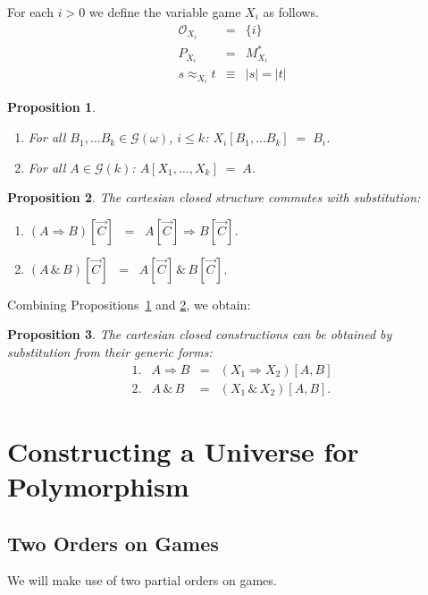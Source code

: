 \documentclass[a4paper,11pt]{article}
\newcommand{\gequiv}{\approx}
\newtheorem{proposition}{Proposition}[section]
\newcommand{\GG}[1]{\mathcal{G}(#1)}
\newcommand{\llwith}{\, \& \,}
\newcommand{\Occ}{\mathcal{O}}
\begin{document}
\noindent For each $i > 0$ we define the variable game $X_i$ as follows.
\[ \begin{array}{lcl}
\Occ_{X_i} & = & \{ i \} \\
P_{X_i} & = & M_{X_i}^{\ast} \\
s \gequiv_{X_i} t & \equiv & | s | = | t |
\end{array}
\]

\begin{proposition}
\label{sub0}
\begin{enumerate}
\item For all $B_1 , \ldots B_k \in \GG{\omega}$, $i \leq k$: $X_i [B_1 , \ldots B_k] \; = \; B_i$.
\item For all $A \in \GG{k}$: $A[X_1 , \ldots , X_k ] \; = \; A$.
\end{enumerate}
\end{proposition}



\begin{proposition}
\label{sub1}
The cartesian closed structure commutes with substitution:
\begin{enumerate}
\item $(A \Rightarrow B)[\vec{C}] \;\; = \;\; A[\vec{C}]
  \Rightarrow B[\vec{C}]$.
\item $(A \llwith B)[\vec{C}] \;\; = \;\; A[\vec{C}]
  \llwith B[\vec{C}]$.
\end{enumerate}
\end{proposition}
Combining Propositions~\ref{sub0} and \ref{sub1}, we obtain:

\begin{proposition}
The cartesian closed constructions can be obtained by substitution
from their generic forms:
\[ \begin{array}{lccc}
1. & A \Rightarrow B & = & (X_1 \Rightarrow X_2)[A, B] \\
2. & A \llwith B &  = &  (X_1 \llwith X_2) [A, B] .
\end{array} \]
\end{proposition}

\section{Constructing a Universe for Polymorphism}
\label{order}
\subsection{Two Orders on Games}
We will make use of two partial orders on games.
\end{document}
